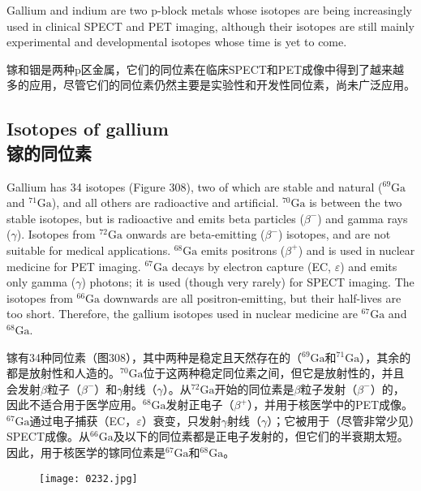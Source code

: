\documentclass[dvipsnames, svgnames,a4paper,11pt]{article}
\begin{document}
Gallium and indium are two p-block metals whose isotopes are being increasingly used in clinical SPECT and PET imaging, although their isotopes are still mainly experimental and developmental isotopes whose time is yet to come.

镓和铟是两种p区金属，它们的同位素在临床SPECT和PET成像中得到了越来越多的应用，尽管它们的同位素仍然主要是实验性和开发性同位素，尚未广泛应用。

\subsection{Isotopes of gallium\\ 镓的同位素}  
Gallium has 34 isotopes (Figure 308), two of which are stable and natural (\(\mathrm{^{69}Ga}\) and \(\mathrm{^{71}Ga}\)), and all others are radioactive and artificial. \(\mathrm{^{70}Ga}\) is between the two stable isotopes, but is radioactive and emits beta particles (\(\beta^-\)) and gamma rays (\(\gamma\)). Isotopes from \(\mathrm{^{72}Ga}\) onwards are beta-emitting (\(\beta^-\)) isotopes, and are not suitable for medical applications. \(\mathrm{^{68}Ga}\) emits positrons (\(\beta^+\)) and is used in nuclear medicine for PET imaging. \(\mathrm{^{67}Ga}\) decays by electron capture (EC, \(\varepsilon\)) and emits only gamma (\(\gamma\)) photons; it is used (though very rarely) for SPECT imaging. The isotopes from \(\mathrm{^{66}Ga}\) downwards are all positron-emitting, but their half-lives are too short. Therefore, the gallium isotopes used in nuclear medicine are \(\mathrm{^{67}Ga}\) and \(\mathrm{^{68}Ga}\).

镓有34种同位素（图308），其中两种是稳定且天然存在的（\(\mathrm{^{69}Ga}\)和\(\mathrm{^{71}Ga}\)），其余的都是放射性和人造的。\(\mathrm{^{70}Ga}\)位于这两种稳定同位素之间，但它是放射性的，并且会发射\(\beta\)粒子（\(\beta^-\)）和$\gamma$射线（\(\gamma\)）。从\(\mathrm{^{72}Ga}\)开始的同位素是\(\beta\)粒子发射（\(\beta^-\)）的，因此不适合用于医学应用。\(\mathrm{^{68}Ga}\)发射正电子（\(\beta^+\)），并用于核医学中的PET成像。\(\mathrm{^{67}Ga}\)通过电子捕获（EC，\(\varepsilon\)）衰变，只发射$\gamma$射线（\(\gamma\)）；它被用于（尽管非常少见）SPECT成像。从\(\mathrm{^{66}Ga}\)及以下的同位素都是正电子发射的，但它们的半衰期太短。因此，用于核医学的镓同位素是\(\mathrm{^{67}Ga}\)和\(\mathrm{^{68}Ga}\)。

\begin{figure}[h]
	\centering
    \texttt{[image: 0232.jpg]}  
     \label{fig308}
\end{figure}
\end{document}
